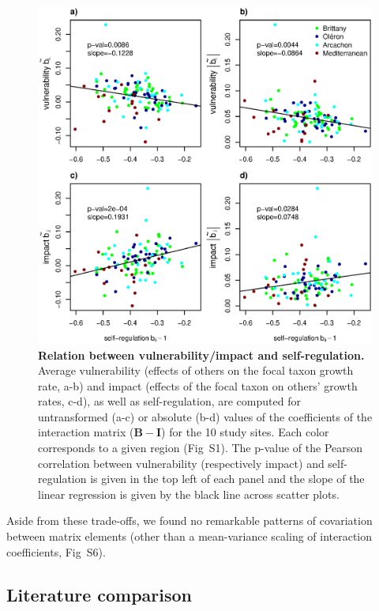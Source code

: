 \documentclass[10pt]{article}
\begin{document}
\begin{figure}[!h]
\centering
\includegraphics[width=\textwidth]{pencen_generality_vs_vulnerability_MainFig}
\caption{\textbf{Relation between vulnerability/impact and self-regulation.}
Average vulnerability (effects of others on the focal taxon growth
rate, a-b) and impact (effects of the focal taxon on others' growth
rates, c-d), as well as self-regulation, are computed for untransformed
(a-c) or absolute (b-d) values of the coefficients of the interaction
matrix ($\mathbf{B}-\mathbf{I}$) for the 10 study sites. Each color
corresponds to a given region (Fig~S1). The p-value
of the Pearson correlation between vulnerability (respectively impact)
and self-regulation is given in the top left of each panel and the
slope of the linear regression is given by the black line across scatter
plots.}
\label{fig:Vulnerability_impact}
\end{figure}

Aside from these trade-offs, we found no
remarkable patterns of covariation between matrix elements (other
than a mean-variance scaling of interaction coefficients, Fig~S6).

\subsection*{Literature comparison}
\end{document}
